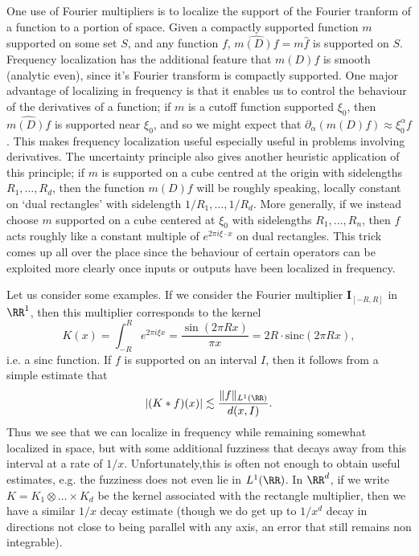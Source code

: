One use of Fourier multipliers is to localize the support of the Fourier tranform of a function to a portion of space. Given a compactly supported function $m$ supported on some set $S$, and any function $f$, $\widehat{m(D) f} = m \widehat{f}$ is supported on $S$. Frequency localization has the additional feature that $m(D) f$ is smooth (analytic even), since it's Fourier transform is compactly supported. One major advantage of localizing in frequency is that it enables us to control the behaviour of the derivatives of a function; if $m$ is a cutoff function supported $\xi_0$, then $\widehat{m(D) f}$ is supported near $\xi_0$, and so we might expect that $\partial_\alpha (m(D) f) \approx \xi_0^\alpha f$. This makes frequency localization useful especially useful in problems involving derivatives. The uncertainty principle also gives another heuristic application of this principle; if $m$ is supported on a cube centred at the origin with sidelengths $R_1,\dots,R_d$, then the function $m(D) f$ will be roughly speaking, locally constant on `dual rectangles' with sidelength $1/R_1, \dots, 1/R_d$. More generally, if we instead choose $m$ supported on a cube centered at $\xi_0$ with sidelengths $R_1,\dots,R_n$, then $f$ acts roughly like a constant multiple of $e^{2 \pi i \xi \cdot x}$ on dual rectangles. This trick comes up all over the place since the behaviour of certain operators can be exploited more clearly once inputs or outputs have been localized in frequency.

Let us consider some examples. If we consider the Fourier multiplier $\mathbf{I}_{[-R,R]}$ in $\RR^1$, then this multiplier corresponds to the kernel
%
\[ K(x) = \int_{-R}^R e^{2 \pi i \xi x} = \frac{\sin(2 \pi R x)}{\pi x} = 2R \cdot \text{sinc}(2 \pi R x), \]
%
i.e. a sinc function. If $f$ is supported on an interval $I$, then it follows from a simple estimate that
%
\[ |(K * f)(x)| \lesssim \frac{\| f \|_{L^1(\RR)}}{d(x,I)}. \]
%
Thus we see that we can localize in frequency while remaining somewhat localized in space, but with some additional fuzziness that decays away from this interval at a rate of $1/x$. Unfortunately,this is often not enough to obtain useful estimates, e.g. the fuzziness does not even lie in $L^1(\RR)$. In $\RR^d$, if we write $K = K_1 \otimes \dots \times K_d$ be the kernel associated with the rectangle multiplier, then we have a similar $1/x$ decay estimate (though we do get up to $1/x^d$ decay in directions not close to being parallel with any axis, an error that still remains non integrable).

